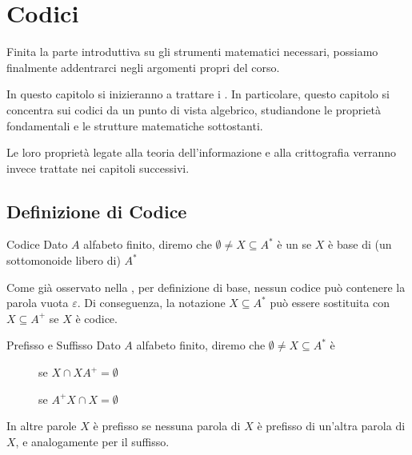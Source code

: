 \chapter{Codici}

Finita la parte introduttiva su gli strumenti matematici necessari,
possiamo finalmente addentrarci negli argomenti propri del corso.

In questo capitolo si inizieranno a trattare i .
In particolare, questo capitolo si concentra sui codici da un punto di vista algebrico, studiandone le proprietà fondamentali e le strutture matematiche sottostanti.

Le loro proprietà legate alla teoria dell'informazione e alla crittografia verranno invece trattate nei capitoli successivi.

\section{Definizione di Codice}
\begin{definition}{Codice}
  Dato \(A\) alfabeto finito, diremo che \(\emptyset \neq X \subseteq A^*\) è un  se \(X\) è base di (un sottomonoide libero di) \(A^*\)
\end{definition}

\begin{note}{}
  Come già osservato nella , per definizione di base, nessun codice può contenere la parola vuota \(\varepsilon\).
  Di conseguenza, la notazione \(X \subseteq A^*\) può essere sostituita con \(X \subseteq A^+\) se \(X\) è codice.
\end{note}

\begin{definition}{Prefisso e Suffisso}
  Dato \(A\) alfabeto finito, diremo che \(\emptyset \neq X \subseteq A^*\) è
  \begin{description}
    \item[] se \(X\cap XA^+ = \emptyset\)
    \item[] se \(A^+X \cap X = \emptyset\)
  \end{description}
\end{definition}

In altre parole \(X\) è prefisso se nessuna parola di \(X\) è prefisso di un'altra parola di \(X\), e analogamente per il suffisso.

